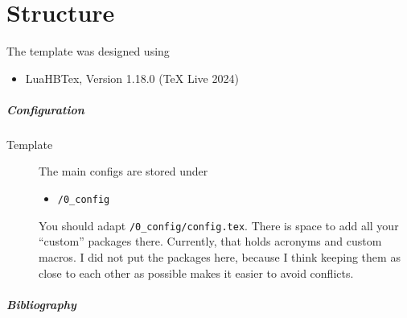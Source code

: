 

\cleardoublepage
\chapter{Structure}

The template was designed using 

\begin{itemize}
	\item LuaHBTex, Version 1.18.0 (TeX Live 2024)
\end{itemize}

\paragraph{Configuration}

\begin{description}
	\item[Template] The main configs are stored under 
	\begin{itemize}
	 	\item \lstinline{/0_config}
	 \end{itemize} 
	 You should adapt \lstinline{/0_config/config.tex}. There is space to add all your ``custom'' packages there.
	 Currently, that holds acronyms and custom macros. I did not put the packages here, because I think keeping them as close to each other as possible makes it easier to avoid conflicts.
\end{description}





\paragraph{Bibliography}

